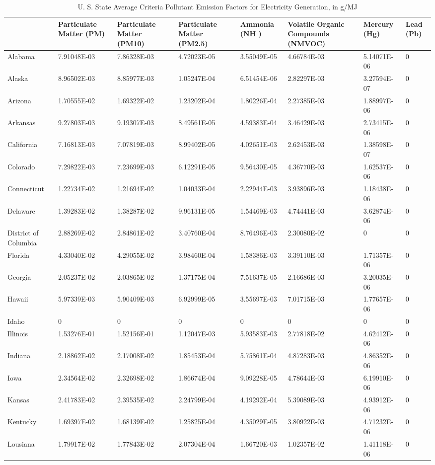 \begin{longtable}[c]{p{0.75in}p{0.75in}p{0.75in}p{0.75in}p{0.75in}p{0.75in}p{0.75in}p{0.75in}}
\caption{  U. S. State Average Criteria Pollutant Emission Factors for Electricity Generation, in g/MJ \protect \label{table:u.-s.-state-average-criteria-pollutant}}\\
\toprule 
~ & Particulate Matter (PM) & Particulate Matter (PM10) & Particulate Matter (PM2.5) & Ammonia (NH  ) & Volatile Organic Compounds (NMVOC) & Mercury (Hg) & Lead (Pb) \tabularnewline \midrule
\endhead
Alabama & 7.91048E-03 & 7.86328E-03 & 4.72023E-05 & 3.55049E-05 & 4.66784E-03 & 5.14071E-06 & 0 \tabularnewline
Alaska & 8.96502E-03 & 8.85977E-03 & 1.05247E-04 & 6.51454E-06 & 2.82297E-03 & 3.27594E-07 & 0 \tabularnewline
Arizona & 1.70555E-02 & 1.69322E-02 & 1.23202E-04 & 1.80226E-04 & 2.27385E-03 & 1.88997E-06 & 0 \tabularnewline
Arkansas & 9.27803E-03 & 9.19307E-03 & 8.49561E-05 & 4.59383E-04 & 3.46429E-03 & 2.73415E-06 & 0 \tabularnewline
California & 7.16813E-03 & 7.07819E-03 & 8.99402E-05 & 4.02651E-03 & 2.62453E-03 & 1.38598E-07 & 0 \tabularnewline
Colorado & 7.29822E-03 & 7.23699E-03 & 6.12291E-05 & 9.56430E-05 & 4.36770E-03 & 1.62537E-06 & 0 \tabularnewline
Connecticut & 1.22734E-02 & 1.21694E-02 & 1.04033E-04 & 2.22944E-03 & 3.93896E-03 & 1.18438E-06 & 0 \tabularnewline
Delaware & 1.39283E-02 & 1.38287E-02 & 9.96131E-05 & 1.54469E-03 & 4.74441E-03 & 3.62874E-06 & 0 \tabularnewline
District of Columbia & 2.88269E-02 & 2.84861E-02 & 3.40760E-04 & 8.76496E-03 & 2.30080E-02 & 0 & 0 \tabularnewline
Florida & 4.33040E-02 & 4.29055E-02 & 3.98460E-04 & 1.58386E-03 & 3.39110E-03 & 1.71357E-06 & 0 \tabularnewline
Georgia & 2.05237E-02 & 2.03865E-02 & 1.37175E-04 & 7.51637E-05 & 2.16686E-03 & 3.20035E-06 & 0 \tabularnewline
Hawaii & 5.97339E-03 & 5.90409E-03 & 6.92999E-05 & 3.55697E-03 & 7.01715E-03 & 1.77657E-06 & 0 \tabularnewline
Idaho & 0 & 0 & 0 & 0 & 0 & 0 & 0 \tabularnewline
Illinois & 1.53276E-01 & 1.52156E-01 & 1.12047E-03 & 5.93583E-03 & 2.77818E-02 & 4.62412E-06 & 0 \tabularnewline
Indiana & 2.18862E-02 & 2.17008E-02 & 1.85453E-04 & 5.75861E-04 & 4.87283E-03 & 4.86352E-06 & 0 \tabularnewline
Iowa & 2.34564E-02 & 2.32698E-02 & 1.86674E-04 & 9.09228E-05 & 4.78644E-03 & 6.19910E-06 & 0 \tabularnewline
Kansas & 2.41783E-02 & 2.39535E-02 & 2.24799E-04 & 4.19292E-04 & 5.39089E-03 & 4.93912E-06 & 0 \tabularnewline
Kentucky & 1.69397E-02 & 1.68139E-02 & 1.25825E-04 & 4.35029E-05 & 3.80922E-03 & 4.71232E-06 & 0 \tabularnewline
Lousiana & 1.79917E-02 & 1.77843E-02 & 2.07304E-04 & 1.66720E-03 & 1.02357E-02 & 1.41118E-06 & 0 \tabularnewline

\end{longtable}
